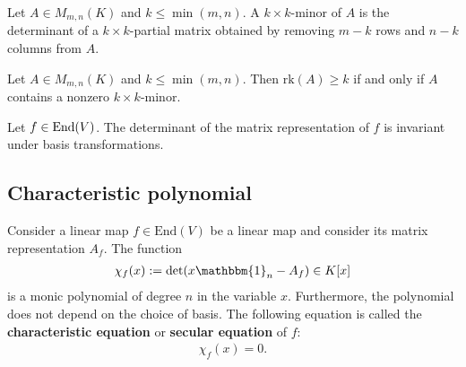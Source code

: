     \begin{adefinition}[Minor]
        Let $A\in M_{m,n}(K)$ and $k\leq\min(m, n)$. A $k\times k$-minor of $A$ is the determinant of a $k\times k$-partial matrix obtained by removing $m-k$ rows and $n-k$ columns from $A$.
    \end{adefinition}
    \begin{property}
        Let $A\in M_{m,n}(K)$ and $k\leq\min(m, n)$. Then $\text{rk}(A)\geq k$ if and only if $A$ contains a nonzero $k\times k$-minor.
    \end{property}

    \begin{property}
        Let $f\in\textup{End}(V)$. The determinant of the matrix representation of $f$ is invariant under basis transformations.
    \end{property}

\subsection{Characteristic polynomial}

    \begin{definition}\label{linalgebra:characteristic_polynomial}
        Consider a linear map $f\in\text{End}(V)$ be a linear map and consider its matrix representation $A_f$. The function
        \begin{gather}
            \chi_f(x) := \det(x\mathbbm{1}_n-A_f)\in K[x]
        \end{gather}
        is a monic polynomial of degree $n$ in the variable $x$. Furthermore, the polynomial does not depend on the choice of basis. The following equation is called the \textbf{characteristic equation} or \textbf{secular equation} of $f$:
        \begin{gather}
            \label{linalgebra:characteristic_equation}
            \chi_f(x) = 0.
        \end{gather}
    \end{definition}


